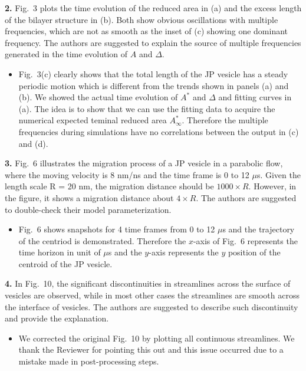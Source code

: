 \documentclass[11pt]{article}
\newcommand{\comment}[1]{{\color{blue} #1}}
\begin{document}
\noindent
\comment{{\bf 2.} Fig.~3 plots the time evolution of the reduced area in (a) and
the excess length of the bilayer structure in (b). Both show obvious
oscillations with multiple frequencies, which are not as smooth as the
inset of (c) showing one dominant frequency. The authors are suggested
to explain the source of multiple frequencies generated in the time
evolution of $A$ and $\Delta$.}
\begin{itemize}
  \item Fig.~3(c) clearly shows that the total length of the JP vesicle has a steady periodic motion 
which is different from the trends shown in panels (a) and (b). We showed the actual time evolution of $A^*$ and $\Delta$ and fitting curves in (a). 
The idea is to show that we can use the fitting data to acquire the numerical expected teminal 
reduced area $A^*_\infty$. Therefore the multiple frequencies during simulations have no correlations between
the output in (c) and (d).
\end{itemize}

\noindent
\comment{{\bf 3.} Fig.~6 illustrates the migration process of a JP vesicle in a
parabolic flow, where the moving velocity is 8 nm/ns and the time frame
is 0 to 12 $\mu$s. Given the length scale R = 20 nm, the migration
distance should be $1000 \times R$. However, in the figure, it shows a
migration distance about $4 \times R$. The authors are suggested to
double-check their model parameterization.}
\begin{itemize}
  \item Fig.~6 shows snapshots for 4 time frames from 0 to 12 $\mu$s and the trajectory of the centriod is demonstrated. Therefore the $x$-axis of Fig.~6 represents the time horizon in unit of $\mu$s and 
the $y$-axis represents the $y$ position of the centroid of the JP vesicle.
\end{itemize}

\noindent
\comment{{\bf 4.} In Fig.~10, the significant discontinuities in streamlines
across the surface of vesicles are observed, while in most other cases
the streamlines are smooth across the interface of vesicles. The authors
are suggested to describe such discontinuity and provide the
explanation.}
\begin{itemize}
  \item We corrected the original Fig.~10 by plotting all continuous streamlines. We thank the Reviewer for pointing this out and this issue occurred due to a mistake made in post-processing
steps.
\end{itemize}
\end{document}
